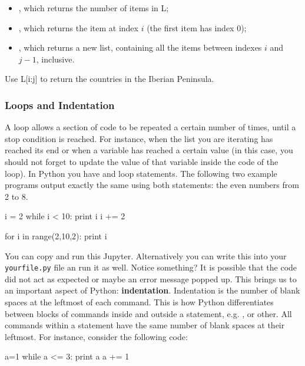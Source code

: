 \begin{itemize}
 \item {}, which returns the number of items in L;
 \item {}, which returns the item at index $i$ (the first item has index 0);
 \item {}, which returns a new list, containing all the items between indexes $i$ and $j-1$, inclusive. 
\end{itemize}

\begin{exercise}
 Use L[i:j] to return the countries in the Iberian Peninsula.
\end{exercise}

\subsubsection{Loops and Indentation}

A loop allows a section of code to be repeated a certain number of times, until
a stop condition is reached. For instance, when the list you are iterating has
reached its end or when a variable has reached a certain value (in this case,
you should not forget to update the value of that variable inside the code of
the loop). In Python you have  and  loop statements. The
following two example programs output exactly the same using both statements:
the even numbers from 2 to 8.

\begin{python}
i = 2
while i < 10:
  print i  
  i += 2 
\end{python}

\begin{python}
for i in range(2,10,2):
    print i
\end{python}

You can copy and run this Jupyter. Alternatively you can write this into your
\texttt{yourfile.py} file an run it as well. Notice something? It is possible
that the code did not act as expected or maybe an error message popped up. This
brings us to an important aspect of Python: \textbf{indentation}. Indentation
is the number of blank spaces at the leftmost of each command. This is how
Python differentiates between blocks of commands inside and outside a
statement, e.g. ,  or other. All commands within a
statement have the same number of blank spaces at their leftmost. For instance,
consider the following code: 

\begin{python}
a=1
while a <= 3:
    print a
    a += 1
\end{python}

